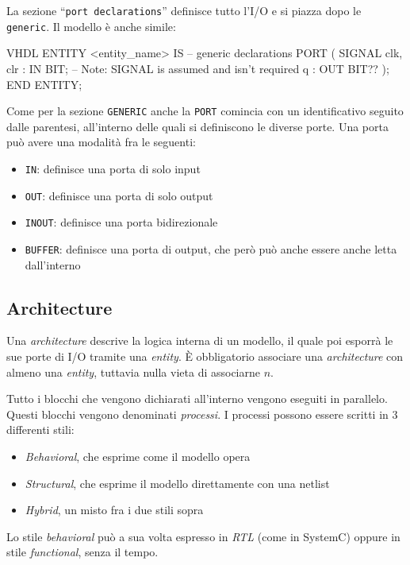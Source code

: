 \documentclass[10pt,a4paper,oneside]{scrbook}
\begin{document}
La sezione ``\texttt{port declarations}'' definisce tutto l'I/O e si piazza 
dopo le \texttt{generic}. Il modello è anche simile:
\begin{sourcecode}{VHDL}
ENTITY <entity_name> IS
    -- generic declarations
    PORT (
        SIGNAL clk, clr : IN    BIT;
        -- Note: SIGNAL is assumed and isn't required
        q               : OUT   BIT??
    );
END ENTITY;
\end{sourcecode}
Come per la sezione \texttt{GENERIC} anche la \texttt{PORT} comincia con un 
identificativo seguito dalle parentesi, all'interno delle quali si definiscono 
le diverse porte.
Una porta può avere una modalità fra le seguenti:
\begin{itemize}
    \item \texttt{IN}: definisce una porta di solo input
    \item \texttt{OUT}: definisce una porta di solo output
    \item \texttt{INOUT}: definisce una porta bidirezionale
    \item \texttt{BUFFER}: definisce una porta di output, che però può anche 
    essere anche letta dall'interno
\end{itemize}

\subsection{Architecture}
Una \textit{architecture} descrive la logica interna di un modello, il quale 
poi esporrà le sue porte di I/O tramite una \textit{entity}. È obbligatorio 
associare una \textit{architecture} con almeno una \textit{entity}, tuttavia 
nulla vieta di associarne $n$.

Tutto i blocchi che vengono dichiarati all'interno vengono eseguiti in 
parallelo. Questi blocchi vengono denominati \textit{processi}.
I processi possono essere scritti in 3 differenti stili:
\begin{itemize}
    \item \textit{Behavioral}, che esprime come il modello opera
    \item \textit{Structural}, che esprime il modello direttamente con una 
    netlist
    \item \textit{Hybrid}, un misto fra i due stili sopra
\end{itemize}
Lo stile \textit{behavioral} può a sua volta espresso in \textit{RTL} (come in 
SystemC) oppure in stile \textit{functional}, senza il tempo.
\end{document}
